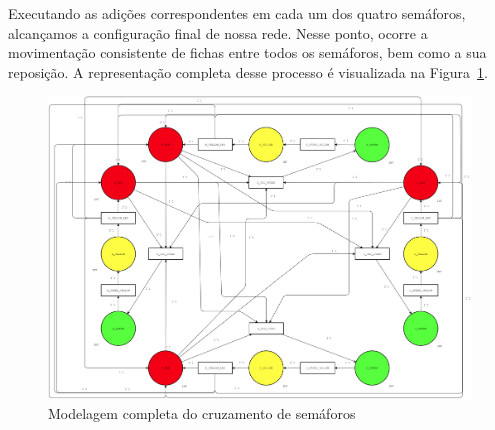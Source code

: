 Executando as adições correspondentes em cada um dos quatro semáforos, alcançamos a configuração final de nossa rede.
Nesse ponto, ocorre a movimentação consistente de fichas entre todos os semáforos, bem como a sua reposição.
A representação completa desse processo é visualizada na Figura~\ref{fig:full_petri_net}.

\begin{figure}[ht]
	\centering
	\includegraphics[width=1\textwidth]{images/full_petri_net.png}
	\caption{Modelagem completa do cruzamento de semáforos}
    \label{fig:full_petri_net}
\end{figure}